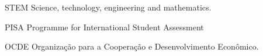 \begin{siglas}
  \item[STEM] Science, technology, engineering and mathematics.
  \item[PISA] Programme for International Student Assessment
  \item[OCDE] Organização para a Cooperação e Desenvolvimento Econômico.
\end{siglas}

